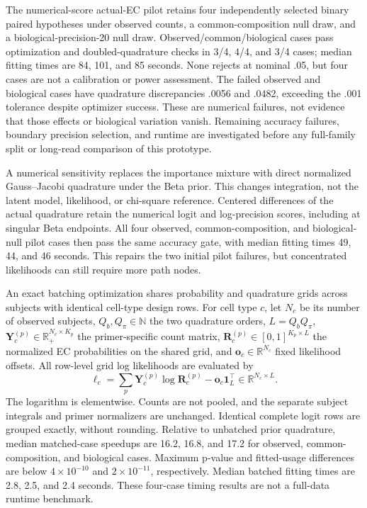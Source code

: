 \documentclass[11pt]{article}
\begin{document}
The numerical-score actual-EC pilot retains four independently selected binary paired hypotheses under observed counts, a common-composition null draw, and a biological-precision-20 null draw. Observed/common/biological cases pass optimization and doubled-quadrature checks in 3/4, 4/4, and 3/4 cases; median fitting times are 84, 101, and 85 seconds. None rejects at nominal .05, but four cases are not a calibration or power assessment. The failed observed and biological cases have quadrature discrepancies .0056 and .0482, exceeding the .001 tolerance despite optimizer success. These are numerical failures, not evidence that those effects or biological variation vanish. Remaining accuracy failures, boundary precision selection, and runtime are investigated before any full-family split or long-read comparison of this prototype.

A numerical sensitivity replaces the importance mixture with direct normalized Gauss--Jacobi quadrature under the Beta prior. This changes integration, not the latent model, likelihood, or chi-square reference. Centered differences of the actual quadrature retain the numerical logit and log-precision scores, including at singular Beta endpoints. All four observed, common-composition, and biological-null pilot cases then pass the same accuracy gate, with median fitting times 49, 44, and 46 seconds. This repairs the two initial pilot failures, but concentrated likelihoods can still require more path nodes.

An exact batching optimization shares probability and quadrature grids across subjects with identical cell-type design rows. For cell type \(c\), let \(N_c\) be its number of observed subjects, \(Q_b,Q_\pi\in\mathbb N\) the two quadrature orders, \(L=Q_bQ_\pi\), \(\mathbf Y_c^{(p)}\in\mathbb R_+^{N_c\times K_p}\) the primer-specific count matrix, \(\mathbf R_c^{(p)}\in[0,1]^{K_p\times L}\) the normalized EC probabilities on the shared grid, and \(\mathbf o_c\in\mathbb R^{N_c}\) fixed likelihood offsets. All row-level grid log likelihoods are evaluated by \begin{equation}\boldsymbol\ell_c=\sum_p\mathbf Y_c^{(p)}\log\mathbf R_c^{(p)}-\mathbf o_c\mathbf1_L^\top\in\mathbb R^{N_c\times L}.\end{equation} The logarithm is elementwise. Counts are not pooled, and the separate subject integrals and primer normalizers are unchanged. Identical complete logit rows are grouped exactly, without rounding. Relative to unbatched prior quadrature, median matched-case speedups are 16.2, 16.8, and 17.2 for observed, common-composition, and biological cases. Maximum p-value and fitted-usage differences are below \(4\times10^{-10}\) and \(2\times10^{-11}\), respectively. Median batched fitting times are 2.8, 2.5, and 2.4 seconds. These four-case timing results are not a full-data runtime benchmark.
\end{document}
